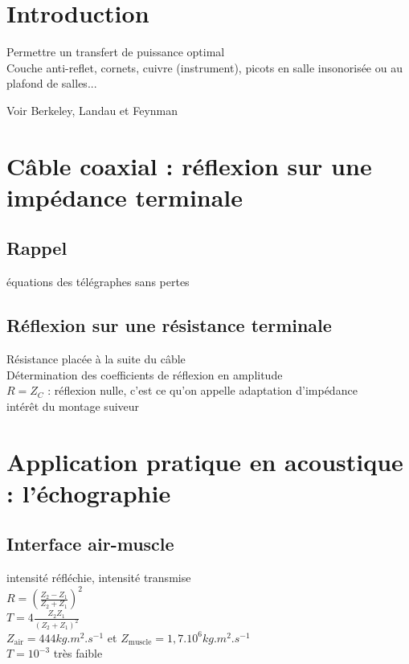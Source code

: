 


\biblio{}

\section*{Introduction}

Permettre un transfert de puissance optimal \\
Couche anti-reflet, cornets, cuivre (instrument), picots en salle insonorisée ou au plafond de salles... \\


Voir Berkeley, Landau et Feynman \\

\section{Câble coaxial : réflexion sur une impédance terminale}
\subsection{Rappel}
équations des télégraphes sans pertes \\
\subsection{Réflexion sur une résistance terminale}
Résistance placée à la suite du câble \\
Détermination des coefficients de réflexion en amplitude \\
$R=Z_C$ : réflexion nulle, c'est ce qu'on appelle adaptation d'impédance \\
intérêt du montage suiveur \\
\section{Application pratique en acoustique : l'échographie}
\subsection{Interface air-muscle}
intensité réfléchie, intensité transmise \\
$R=\left( \frac{Z_2 - Z_1}{Z_2 + Z_1} \right)^2 $ \\
$T=4 \frac{Z_2 Z_1}{\left( Z_2 + Z_1\right)^2} $  \\
$Z_\mathrm{air}=444 kg.m^2.s^{-1}$ et $Z_\mathrm{muscle}=1,7 . 10^6 kg.m^2.s^{-1}$ \\
$T=10^{-3}$ très faible

